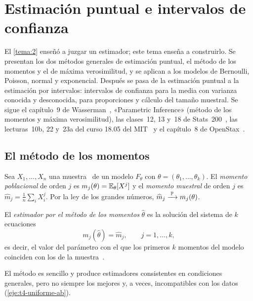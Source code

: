 \chapter{Estimación puntual e intervalos de confianza}
\label{tema:4}

El \cref{tema:2} enseñó a juzgar un estimador; este tema enseña a construirlo. Se presentan los dos métodos generales de estimación puntual, el método de los momentos y el de máxima verosimilitud, y se aplican a los modelos de Bernoulli, Poisson, normal y exponencial. Después se pasa de la estimación puntual a la estimación por intervalos: intervalos de confianza para la media con varianza conocida y desconocida, para proporciones y cálculo del tamaño muestral. Se sigue el capítulo~9 de Wasserman~\cite{wasserman}, «Parametric Inference» (método de los momentos y máxima verosimilitud), las clases~12, 13 y~18 de Stats~200~\cite{stats200}, las lecturas~10b, 22 y~23a del curso 18.05 del MIT~\cite{mit1805} y el capítulo~8 de OpenStax~\cite{openstax}.

\section{El método de los momentos}

Sea $X_1,\dots,X_n$ una muestra \iid\ de un modelo $F_\theta$ con $\theta=(\theta_1,\dots,\theta_k)$. El \emph{momento poblacional} de orden $j$ es $m_j(\theta)=\mathbb{E}_\theta[X^{j}]$ y el \emph{momento muestral} de orden $j$ es $\widehat m_j=\frac1n\sum_iX_i^{j}$. Por la ley de los grandes números, $\widehat m_j\xrightarrow{\;\mathbb{P}\;} m_j(\theta)$.

\begin{definicion}\label{def:t4-momentos}
El \emph{estimador por el método de los momentos} $\widehat\theta$ es la solución del sistema de $k$ ecuaciones
\[
m_j(\widehat\theta)=\widehat m_j,\qquad j=1,\dots,k,
\]
es decir, el valor del parámetro con el que los primeros $k$ momentos del modelo coinciden con los de la muestra~\cite[cap.~9]{wasserman}.
\end{definicion}

\addtocounter{definicion}{1}%

El método es sencillo y produce estimadores consistentes en condiciones generales, pero no siempre los mejores y, a veces, incompatibles con los datos (\cref{eje:t4-uniforme-ab}).


